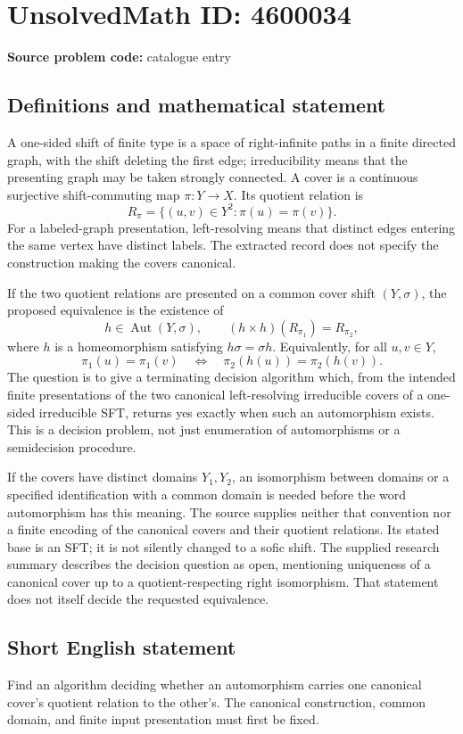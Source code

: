 \documentclass[11pt]{article}
\begin{document}
\section*{UnsolvedMath ID: 4600034}
\textbf{Source problem code:} catalogue entry
\subsection{Definitions and mathematical statement}
A one-sided shift of finite type is a space of right-infinite paths in a finite directed graph, with the shift deleting the first edge; irreducibility means that the presenting graph may be taken strongly connected. A cover is a continuous surjective shift-commuting map \(\pi:Y\to X\). Its quotient relation is
\[
R_\pi=\{(u,v)\in Y^2:\pi(u)=\pi(v)\}.
\]
For a labeled-graph presentation, left-resolving means that distinct edges entering the same vertex have distinct labels. The extracted record does not specify the construction making the covers canonical.

If the two quotient relations are presented on a common cover shift \((Y,\sigma)\), the proposed equivalence is the existence of
\[
h\in\operatorname{Aut}(Y,\sigma),\qquad (h\times h)(R_{\pi_1})=R_{\pi_2},
\]
where \(h\) is a homeomorphism satisfying \(h\sigma=\sigma h\). Equivalently, for all \(u,v\in Y\),
\[
\pi_1(u)=\pi_1(v)\quad\Longleftrightarrow\quad
\pi_2(h(u))=\pi_2(h(v)).
\]
The question is to give a terminating decision algorithm which, from the intended finite presentations of the two canonical left-resolving irreducible covers of a one-sided irreducible SFT, returns yes exactly when such an automorphism exists. This is a decision problem, not just enumeration of automorphisms or a semidecision procedure.

If the covers have distinct domains \(Y_1,Y_2\), an isomorphism between domains or a specified identification with a common domain is needed before the word automorphism has this meaning. The source supplies neither that convention nor a finite encoding of the canonical covers and their quotient relations. Its stated base is an SFT; it is not silently changed to a sofic shift. The supplied research summary describes the decision question as open, mentioning uniqueness of a canonical cover up to a quotient-respecting right isomorphism. That statement does not itself decide the requested equivalence.
\subsection{Short English statement}
Find an algorithm deciding whether an automorphism carries one canonical cover's quotient relation to the other's. The canonical construction, common domain, and finite input presentation must first be fixed.
\end{document}
